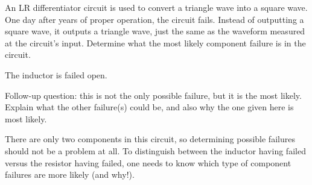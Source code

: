 

An LR differentiator circuit is used to convert a triangle wave into a square wave.  One day after years of proper operation, the circuit fails.  Instead of outputting a square wave, it outputs a triangle wave, just the same as the waveform measured at the circuit's input.  Determine what the most likely component failure is in the circuit.







The inductor is failed open.

\vskip 10pt

Follow-up question: this is not the only possible failure, but it is the most likely.  Explain what the other failure(s) could be, and also why the one given here is most likely.







There are only two components in this circuit, so determining possible failures should not be a problem at all.  To distinguish between the inductor having failed versus the resistor having failed, one needs to know which type of component failures are more likely (and why!).




